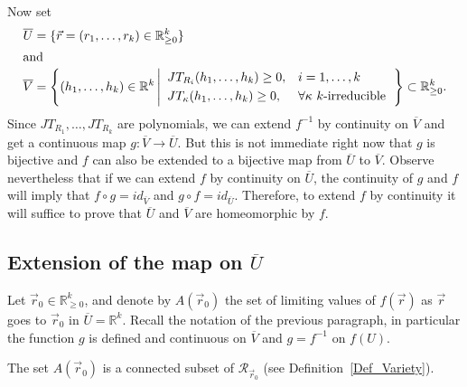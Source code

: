 \documentclass[ALCO,ThmDefs,Unicode,epreuves]{cedram}
\begin{document}
Now set
\begin{align*}
\overline{U} & =\{\vec{r}=(r_{1},\ldots,r_{k})\in\mathbb{R}_{\geq0}%
^{k}\}\\
\intertext{and }
\overline{V} & =\left\{ (h_{1},\ldots,h_{k})\in\mathbb{R}^{k}%
\left\vert
\begin{array}[c]{ll}
JT_{R_{i}}(h_{1},\ldots,h_{k})\geq0,&i=1,\ldots,k\\[3pt]
JT_{\kappa}(h_{1},\ldots,h_{k})\geq0, &\forall\kappa\text{ }%
k\text{-irreducible}%
\end{array}
\right. 
\right\} \subset\mathbb{R}_{\geq0}^{k}.%
\end{align*}
Since $JT_{R_{1}},\ldots,JT_{R_{k}}$ are polynomials, we can extend $f^{-1}$
by continuity on $\overline{V}$ and get a continuous map $g:\overline
{V}\rightarrow\overline{U}$. But this is not immediate right now that $g$ is
bijective and $f$ can also be extended to a bijective map from $\overline{U}$
to $\overline{V}$. Observe nevertheless that if we can extend $f$ by
continuity on $\overline{U}$, the continuity of $g$ and $f$ will imply that
$f\circ g=id_{\overline{V}}$ and $g\circ f=id_{\overline{U}}.$ Therefore, to
extend $f$ by continuity it will suffice to prove that $\overline{U} $ and
$\overline{V}$ are homeomorphic by $f$.

\subsection{Extension of the map on \texorpdfstring{$\overline{U}$}{U}}

Let $\vec{r}_{0}\in\mathbb{R}_{\geq0}^{k}$, and denote by $A(\vec{r}_{0})$ the
set of limiting values of $f(\vec{r})$ as $\vec{r}$ goes to $\vec{r}_{0}$ in $\overline{U}=\mathbb{R}^{k}$.
Recall the notation of the previous paragraph, in particular the function $g$
is defined and continuous on $\overline{V}$ and $g=f^{-1}$ on $f(U)$.

\begin{lemma}
The set $A(\vec{r}_{0})$ is a connected subset of $\mathcal{R}_{\vec{r}_{0}}$
(see Definition~\ref{Def_Variety}).
\end{lemma}
\end{document}
